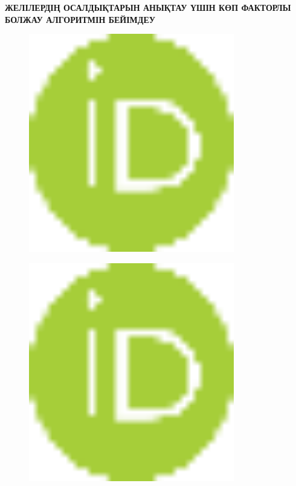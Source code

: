 
{\bfseries ЖЕЛІЛЕРДІҢ ОСАЛДЫҚТАРЫН АНЫҚТАУ ҮШІН КӨП ФАКТОРЛЫ БОЛЖАУ
АЛГОРИТМІН БЕЙІМДЕУ}

\begin{figure}[H]
	\centering
	\includegraphics[width=0.8\textwidth]{media/ict2/image2}
	\caption*{}
\end{figure}

\begin{figure}[H]
	\centering
	\includegraphics[width=0.8\textwidth]{media/ict2/image2}
	\caption*{}
\end{figure}


